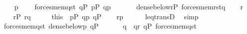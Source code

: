 \begin{isabellebody}
\ \ \ \ {\isacharcomma}{\kern0pt}p{\isacharparenright}{\kern0pt}{\isachardoublequoteclose}\isanewline
\ \ \ \ {\isachardoublequoteopen}forces{\isacharunderscore}{\kern0pt}mem{\isacharparenleft}{\kern0pt}q{\isacharcomma}{\kern0pt}s{\isacharcomma}{\kern0pt}t{}{\isacharparenright}{\kern0pt}{\isachardoublequoteclose}\ {\isachardoublequoteopen}q{\isasymin}P{\isachardoublequoteclose}\ {\isachardoublequoteopen}p{\isasymin}P{\isachardoublequoteclose}\ {\isachardoublequoteopen}q{\isasympreceq}p{\isachardoublequoteclose}\isanewline
\ \ \isanewline
\ \ \ \ {\isachardoublequoteopen}dense{\isacharunderscore}{\kern0pt}below{\isacharparenleft}{\kern0pt}{\isacharbraceleft}{\kern0pt}r{\isasymin}P{\isachardot}{\kern0pt}\ forces{\isacharunderscore}{\kern0pt}mem{\isacharparenleft}{\kern0pt}r{\isacharcomma}{\kern0pt}s{\isacharcomma}{\kern0pt}t{}{\isacharparenright}{\kern0pt}{\isacharbraceright}{\kern0pt}{\isacharcomma}{\kern0pt}q{\isacharparenright}{\kern0pt}{\isachardoublequoteclose}\isanewline
%
\isadelimproof
%
\endisadelimproof
%
\isatagproof
{}\isamarkupfalse%
\isanewline
\ \ \isamarkupfalse%
\ r\isanewline
\ \ \isamarkupfalse%
\ {\isachardoublequoteopen}r{\isasymin}P{\isachardoublequoteclose}\ {\isachardoublequoteopen}r{\isasympreceq}q{\isachardoublequoteclose}\isanewline
\ \ \isamarkupfalse%
\ \isamarkupfalse%
\ this\ \ {\isacartoucheopen}p{\isasymin}P{\isacartoucheclose}\ {\isacartoucheopen}q{\isasympreceq}p{\isacartoucheclose}\ {\isacartoucheopen}q{\isasymin}P{\isacartoucheclose}\isanewline
\ \ \isamarkupfalse%
\ {\isachardoublequoteopen}r{\isasympreceq}p{\isachardoublequoteclose}\isanewline
\ \ \ \ \isamarkupfalse%
\ leq{\isacharunderscore}{\kern0pt}transD\ \isamarkupfalse%
\ simp\isanewline
\ \ \isamarkupfalse%
\isanewline
\ \ \isamarkupfalse%
\ {\isacartoucheopen}forces{\isacharunderscore}{\kern0pt}mem{\isacharparenleft}{\kern0pt}q{\isacharcomma}{\kern0pt}s{\isacharcomma}{\kern0pt}t{}{\isacharparenright}{\kern0pt}{\isacartoucheclose}\ {\isacartoucheopen}dense{\isacharunderscore}{\kern0pt}below{\isacharparenleft}{\kern0pt}{\isacharunderscore}{\kern0pt}{\isacharcomma}{\kern0pt}p{\isacharparenright}{\kern0pt}{\isacartoucheclose}\ {\isacartoucheopen}q{\isasymin}P{\isacartoucheclose}\isanewline
\ \ \isamarkupfalse%
\isanewline
\ \ \isamarkupfalse%
\ q{}\ \ {\isachardoublequoteopen}q{}{\isasympreceq}r{\isachardoublequoteclose}\ {\isachardoublequoteopen}q{}{\isasymin}P{\isachardoublequoteclose}\ {\isachardoublequoteopen}forces{\isacharunderscore}{\kern0pt}mem{\isacharparenleft}{\kern0pt}q{}{\isacharcomma}{\kern0pt}s{\isacharcomma}{\kern0pt}t{}{\isacharparenright}{\kern0pt}{\isachardoublequoteclose}\isanewline

\end{isabellebody}
